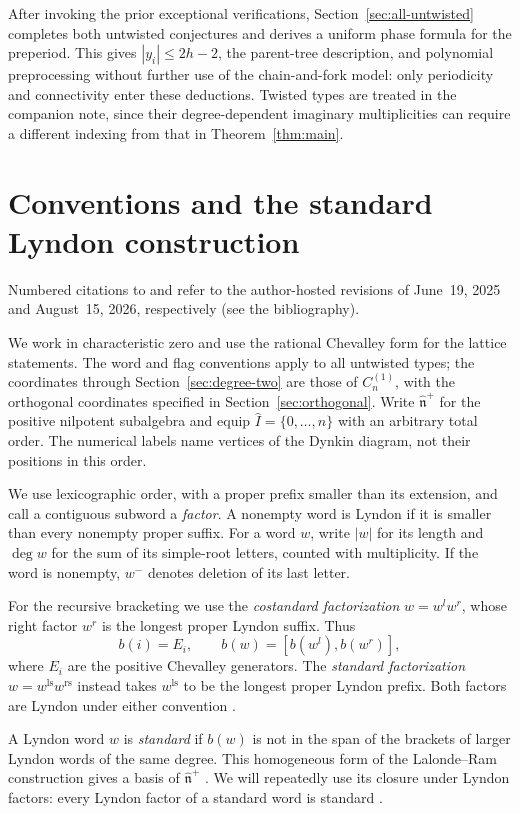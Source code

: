 \documentclass[11pt]{amsart}
\numberwithin{equation}{section}
\theoremstyle{definition}
\newcommand{\nhat}{\widehat{\mathfrak n}^{+}}
\newcommand{\ls}{\mathrm{ls}}
\newcommand{\rs}{\mathrm{rs}}
\newcommand{\br}[1]{b(#1)}
\begin{document}
After invoking the prior exceptional verifications, Section~\ref{sec:all-untwisted} completes both untwisted conjectures and derives a uniform phase formula for the preperiod. This gives $|y_i|\leq2h-2$, the parent-tree description, and polynomial preprocessing without further use of the chain-and-fork model: only periodicity and connectivity enter these deductions. Twisted types are treated in the companion note, since their degree-dependent imaginary multiplicities can require a different indexing from that in Theorem~\ref{thm:main}.

\section{Conventions and the standard Lyndon construction}\label{sec:conventions}

Numbered citations to \cite{ET} and \cite{ETC} refer to the author-hosted revisions of June~19, 2025 and August~15, 2026, respectively (see the bibliography).

We work in characteristic zero and use the rational Chevalley form for the lattice statements. The word and flag conventions apply to all untwisted types; the coordinates through Section~\ref{sec:degree-two} are those of $C_n^{(1)}$, with the orthogonal coordinates specified in Section~\ref{sec:orthogonal}. Write $\nhat$ for the positive nilpotent subalgebra and equip $\widehat I=\{0,\ldots,n\}$ with an arbitrary total order. The numerical labels name vertices of the Dynkin diagram, not their positions in this order.

We use lexicographic order, with a proper prefix smaller than its extension, and call a contiguous subword a \emph{factor}. A nonempty word is Lyndon if it is smaller than every nonempty proper suffix. For a word $w$, write $|w|$ for its length and $\deg w$ for the sum of its simple-root letters, counted with multiplicity. If the word is nonempty, $w^{-}$ denotes deletion of its last letter.

For the recursive bracketing we use the \emph{costandard factorization} $w=w^lw^r$, whose right factor $w^r$ is the longest proper Lyndon suffix. Thus
\[
 \br{i}=E_i,
 \qquad
 \br{w}=[\br{w^l},\br{w^r}],
\]
where $E_i$ are the positive Chevalley generators. The \emph{standard factorization} $w=w^{\ls}w^{\rs}$ instead takes $w^{\ls}$ to be the longest proper Lyndon prefix. Both factors are Lyndon under either convention \cite[Propositions~2.5--2.6]{ETC}.

A Lyndon word $w$ is \emph{standard} if $\br{w}$ is not in the span of the brackets of larger Lyndon words of the same degree. This homogeneous form of the Lalonde--Ram construction gives a basis of $\nhat$ \cite[Theorem~2.1]{LR}. We will repeatedly use its closure under Lyndon factors: every Lyndon factor of a standard word is standard \cite[Proposition~2.4 and Corollary~2.8(b)]{LR}.
\end{document}
